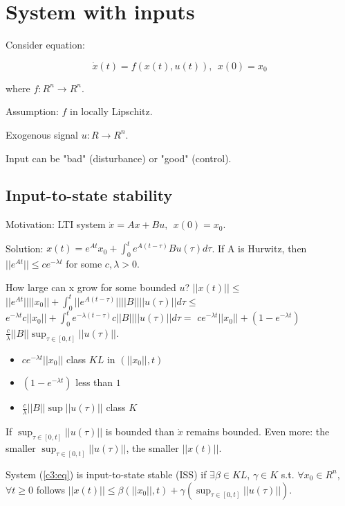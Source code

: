 \section{System with inputs}

Consider equation:

\begin{equation}\label{c3:eq}
 \dot x(t)=f(x(t),u(t)), \ \ x(0)=x_0
\end{equation}

where $f:R^n\to R^n$.

Assumption: $f$ in locally Lipschitz.

Exogenous signal $u:R\to R^n$.

Input can be "bad" (disturbance) or "good" (control).

\subsection{Input-to-state stability}

Motivation: LTI system $\dot x=Ax+Bu, \ \ x(0)=x_0$.

Solution: $x(t)=e^{At}x_0+\int_0^t e^{A(t-\tau)}Bu(\tau) d\tau$.
If A is Hurwitz, then $||e^{At}||\le c e^{-\lambda t}$ for some $c,\lambda>0$.

How large can x grow for some bounded $u$? 
$||x(t)||\le$
$||e^{At}|| ||x_0||+\int_0^t||e^{A(t-\tau)}|| ||B|| ||u(\tau)|| d\tau\le$
$e^{-\lambda t}c||x_0||+\int_0^t e^{-\lambda(t-\tau)}c||B|| ||u(\tau)|| d\tau =$
$c e^{-\lambda t}||x_0||+(1-e^{-\lambda t})$
$\frac{c}{\lambda}||B||\sup_{\tau\in[0,t]} ||u(\tau)||$.

\begin{itemize}
 \item $c e^{-\lambda t}||x_0||$ class $KL$ in $(||x_0||,t)$
 \item $(1-e^{-\lambda t})$ less than $1$
 \item $\frac{c}{\lambda}||B||\sup ||u(\tau)||$ class $K$ 
\end{itemize}

If $\sup_{\tau\in[0,t]} ||u(\tau)||$ is bounded than $\dot x$ remains bounded.
Even more: the smaller $\sup_{\tau\in[0,t]} ||u(\tau)||$, the smaller $||x(t)||$.

\begin{Definition}
 System (\ref{c3:eq}) is input-to-state stable (ISS) if $\exists \beta\in KL$,
 $\gamma\in K$ s.t. $\forall x_0\in R^n$, $\forall t \ge 0$ follows 
 $||x(t)||\le\beta(||x_0||, t)+\gamma(\sup_{\tau\in[0,t]} ||u(\tau)||)$.
\end{Definition}

